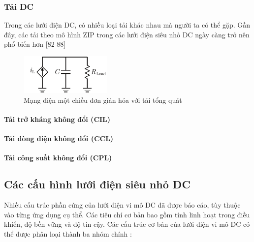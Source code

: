 \subsubsection{Tải DC}
Trong các lưới điện DC, có nhiều loại tải khác nhau mà người ta có thể gặp. Gần đây, các tải theo mô hình ZIP trong các lưới điện siêu nhỏ DC ngày càng trở nên phổ biến hơn [82-88] \par
\begin{figure}
    \centering
    \includegraphics[width= 0.4\textwidth]{Figures/Content_Pages/Chapter_2/C2_5.pdf}
    \caption{Mạng điện một chiều đơn giản hóa với tải tổng quát}
    \label{fig:C2_5}
\end{figure}
\paragraph{Tải trở kháng không đổi (CIL)}

\paragraph{Tải dòng điện không đổi (CCL)}

\paragraph{Tải công suất không đổi (CPL)}

\subsection{Các cấu hình lưới điện siêu nhỏ DC}
Nhiều cấu trúc phần cứng của lưới điện vi mô DC đã được báo cáo, tùy thuộc vào từng ứng dụng cụ thể. Các tiêu chí cơ bản bao gồm tính linh hoạt trong điều khiển, độ bền vững và độ tin cậy. Các cấu trúc cơ bản của lưới điện vi mô DC có thể được phân loại thành ba nhóm chính \cite{dragivcevic2015dc}:\par
